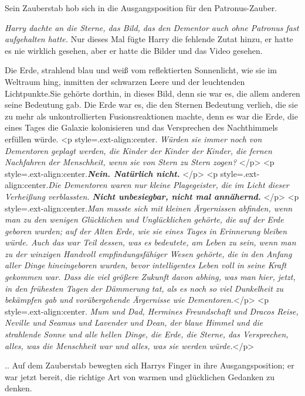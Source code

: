 Sein Zauberstab hob sich in die Ausgangsposition für den Patronus-Zauber.

\emph{Harry dachte an die Sterne, das Bild, das den Dementor auch ohne Patronus
fast aufgehalten hatte.} Nur dieses Mal fügte Harry die fehlende Zutat hinzu, er
hatte es nie wirklich gesehen, aber er hatte die Bilder und das Video gesehen.

Die Erde, strahlend blau und weiß vom reflektierten Sonnenlicht, wie sie im
Weltraum hing, inmitten der schwarzen Leere und der leuchtenden Lichtpunkte.Sie
gehörte dorthin, in dieses Bild, denn sie war es, die allem anderen seine
Bedeutung gab. Die Erde war es, die den Sternen Bedeutung verlieh, die sie zu
mehr als unkontrollierten Fusionsreaktionen machte, denn es war die Erde, die
eines Tages die Galaxie kolonisieren und das Versprechen des Nachthimmels
erfüllen würde. <p style=\grqq{}.ext-align:center\grqq{}. \emph{ Würden sie
immer noch von Dementoren geplagt werden, die Kinder der Kinder der Kinder, die
fernen Nachfahren der Menschheit, wenn sie von Stern zu Stern zogen?} </p> <p
style=\grqq{}.ext-align:center\grqq{}.\emph{\textbf{Nein. Natürlich nicht.}
}</p> <p style=\grqq{}.ext-align:center\grqq{}.\emph{Die Dementoren waren nur
kleine Plagegeister, die im Licht dieser Verheißung verblassten. \textbf{Nicht
unbesiegbar, nicht mal annähernd.}} </p> <p
style=\grqq{}.ext-align:center\grqq{}.\emph{Man musste sich mit kleinen
Ärgernissen abfinden, wenn man zu den wenigen Glücklichen und Unglücklichen
gehörte, die auf der Erde geboren wurden; auf der Alten Erde, wie sie eines
Tages in Erinnerung bleiben würde. Auch das war Teil dessen, was es bedeutete,
am Leben zu sein, wenn man zu der winzigen Handvoll empfindungsfähiger Wesen
gehörte, die in den Anfang aller Dinge hineingeboren wurden, bevor intelligentes
Leben voll in seine Kraft gekommen war. Dass die viel größere Zukunft davon
abhing, was man hier, jetzt, in den frühesten Tagen der Dämmerung tat, als es
noch so viel Dunkelheit zu bekämpfen gab und vorübergehende Ärgernisse wie
Dementoren.}</p> <p style=\grqq{}.ext-align:center\grqq{}.\emph{ Mum und Dad,
Hermines Freundschaft und Dracos Reise, Neville und Seamus und Lavender und
Dean, der blaue Himmel und die strahlende Sonne und alle hellen Dinge, die Erde,
die Sterne, das Versprechen, alles, was die Menschheit war und alles, was sie
werden würde.}</p>

.. Auf dem Zauberstab bewegten sich Harrys Finger in ihre Ausgangsposition; er
war jetzt bereit, die richtige Art von warmen und glücklichen Gedanken zu
denken.

